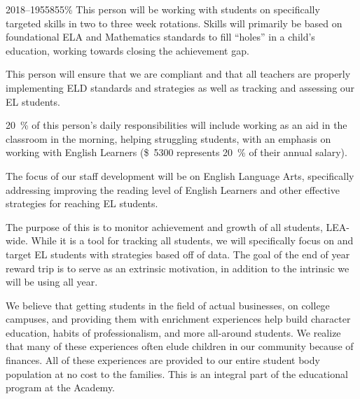 \documentclass{article}
\newcommand{\dollar}[1]{\SI{#1}[\$]{}}
\newcounter{goal}[section] %
\begin{document}
\begin{demIISUP}{2018--19}{55855}{\si{\percent}}
 This person will be working with students on specifically targeted skills in two to three week rotations. Skills will primarily be based on foundational ELA and Mathematics standards to fill ``holes'' in a child's education, working towards closing the achievement gap.

 This person will ensure that we are compliant and that all teachers are properly implementing ELD standards and strategies as well as tracking and assessing our EL students.

 \SI{20}{\percent} of this person's daily responsibilities will include working as an aid in the classroom in the morning, helping struggling students, with an emphasis on working with English Learners (\dollar{5300} represents \SI{20}{\percent} of their annual salary).

 The focus of our staff development will be on English Language Arts, specifically addressing improving the reading level of English Learners and other effective strategies for reaching EL students.

 The purpose of this is to monitor achievement and growth of all students, LEA-wide. While it is a tool for tracking all students, we will specifically focus on and target EL students with strategies based off of data. The goal of the end of year reward trip is to serve as an extrinsic motivation, in addition to the intrinsic we will be using all year.

 We believe that getting students in the field of actual businesses, on college campuses, and providing them with enrichment experiences help build character education, habits of professionalism, and more all-around students. We realize that many of these experiences often elude children in our community because of finances. All of these experiences are provided to our entire student body population at no cost to the families. This is an integral part of the educational program at the Academy.
\end{demIISUP}
\end{document}
